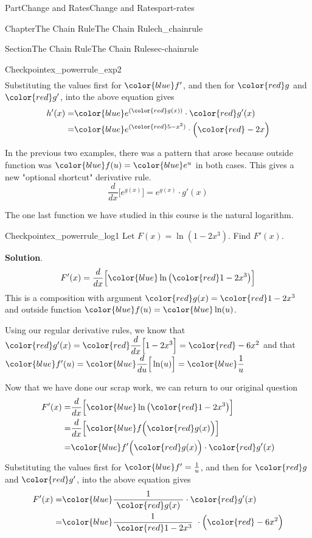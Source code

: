 \documentclass[oneside,10pt,]{tufte-book}
\newcommand{\blocktitlefont}{\relax}
\numberwithin{equation}{chapter}
\newcommand{\red}[1]{   {\color{red}   #1}   }
\newcommand{\blue}[1]{  {\color{blue}  #1}  }
\newcommand{\ddx}[1]{ \dfrac{d}{dx} \Big[ #1 \Big]  }
\newcommand{\ddu}[1]{ \dfrac{d}{du} \Big[ #1 \Big]  }
\newcommand{\amp}{&}
\begin{document}
\begin{partptx}{Part}{Change and Rates}{}{Change and Rates}{}{}{part-rates}
\begin{chapterptx}{Chapter}{The Chain Rule}{}{The Chain Rule}{}{}{ch_chainrule}
\begin{sectionptx}{Section}{The Chain Rule}{}{The Chain Rule}{}{}{sec-chainrule}
\begin{inlineexercise}{Checkpoint}{}{ex_powerrule_exp2}
\begin{align*}
\end{align*}
Substituting the values first for \(\blue{f'}\), and then for  \(\red{g}\) and \(\red{g'}\), into the above equation gives%
\begin{align*}
h'(x) = \amp 
\blue{ e^{(\red{g(x)})} }\cdot \red{g'(x)}\\
= \amp 
\blue{ e^{(\red{5-x^2})} }\cdot \Big(\red{-2x}\Big)
\end{align*}
%
\end{inlineexercise}%
In the previous two examples, there was a pattern that arose because outside function was \(\blue{f(u)} = \blue{e^{u}}\) in both cases.  This gives a new "optional shortcut" derivative rule.%
\begin{equation*}
\ddx{ e^{g(x)}} = e^{g(x)} \cdot g'(x) 
\end{equation*}
%
\par
The one last function we have studied in this course is the natural logarithm.%
\begin{inlineexercise}{Checkpoint}{}{ex_powerrule_log1}%
Let \(F(x) = \ln( 1- 2x^3)\).  Find \(F'(x)\).%
\par\smallskip%
\noindent\textbf{\blocktitlefont Solution}.\hypertarget{ex_powerrule_log1-2}{}\quad{}%
\begin{equation*}
F'(x) = \ddx{ \blue{ \ln\big( \red{1-2x^3} \big) } }
\end{equation*}
This is a composition with argument \(\red{g(x)} = \red{1-2x^3}\) and outside function \(\blue{f(u)} = \blue{ \ln(u) }\).%
\par
Using our regular derivative rules, we know that \(\red{g'(x)} 
= \red{ \ddx{1-2x^3} } = \red{-6x^2} \) and that \(\blue{f'(u)} 
= \blue{\ddu{ \ln(u) }} = \blue{\dfrac{1}{u}} \)%
\par
Now that we have done our scrap work, we can return to our original question%
\begin{align*}
F'(x) = \amp 
\ddx{\blue{ \ln\big(\red{1-2x^3}\big) } }  \\
= \amp \ddx{ \blue{f\Big( \red{g(x)} \Big) } }\\
= \amp \blue{f'\Big( \red{g(x)}\Big)}\cdot \red{g'(x)}
\end{align*}
Substituting the values first for \(\blue{f'}= \frac{1}{u}\), and then for  \(\red{g}\) and \(\red{g'}\), into the above equation gives%
\begin{align*}
F'(x) = \amp 
\blue{ \frac{1}{\ \red{g(x)}\ } }\cdot \red{g'(x)}\\
= \amp 
\blue{ \frac{1}{\ \red{1-2x^3}}\ }\cdot \Big(\red{-6x^2}\Big)

\end{align*}
\end{inlineexercise}
\end{sectionptx}
\end{chapterptx}
\end{partptx}
\end{document}
